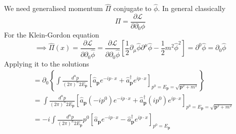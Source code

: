 We need generalised momentum $\hat{\Pi}$ conjugate to $\hat{\phi}$. In general classically
\begin{equation}
    \Pi = \frac{\partial \mathcal{L}}{\partial \partial_0 \phi }
\end{equation}
For the Klein-Gordon equation
\begin{equation}
    \implies \hat{\Pi}(x) = \frac{\partial \mathcal{L}}{\partial \partial_0 \hat{\phi}} = \frac{\partial \mathcal{L}}{\partial \partial_0 \hat{\phi}} \left[  \frac{1}{2} \partial_\mu \hat{\phi} \partial^\mu \hat{\phi} - \frac{1}{2} m^2 \hat{\phi}^2 \right] = \partial^0 \hat{\phi} = \partial_0 \hat{\phi}
\end{equation}
Applying it to the solutions
\begin{align}
  & =  \partial_0 \left\{  \int \frac{d^n p}{(2\pi)^n 2E_{\bm{p}}} \left[ \hat{a}_{\bm{p}} e^{-ip\cdot x} +  \hat{a}^{\dagger}_{\bm{p}} e^{ip\cdot x} \right]_{p^0 = E_{\bm{p}} = \sqrt{\bm{p}^2 + m^2}}   \right\} \nonumber\\
  & = \int \frac{d^n p}{(2\pi)^n 2E_{\bm{p}}} \left[ \hat{a}_{\bm{p}}(-ip^0) e^{-ip\cdot x} +  \hat{a}^{\dagger}_{\bm{p}}(ip^0) e^{ip\cdot x} \right]_{p^0 = E_{\bm{p}} = \sqrt{\bm{p}^2 + m^2}} \nonumber\\
  & = -i \int \frac{d^n p}{(2\pi)^n 2E_{\bm{p}}} p^0 \left[ \hat{a}_{\bm{p}} e^{-ip\cdot x} -  \hat{a}^{\dagger}_{\bm{p}} e^{ip\cdot x} \right]_{p^0 = E_{\bm{p}}}
\end{align}

